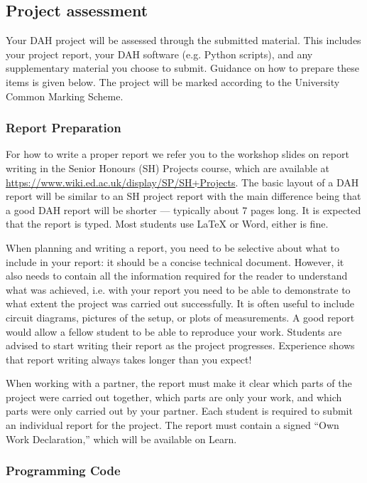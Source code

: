 \subsection{Project assessment}

Your DAH project will be assessed through the submitted material.
This includes your project report, your DAH software (e.g. Python scripts), and any supplementary material you choose to submit.
Guidance on how to prepare these items is given below.
The project will be marked according to the University Common Marking Scheme. 

\subsubsection{Report Preparation}

For how to write a proper report we refer you to the workshop slides on report writing in the Senior Honours (SH) Projects course, which are available at \url{https://www.wiki.ed.ac.uk/display/SP/SH+Projects}.
The basic layout of a DAH report will be similar to an SH project report with the main difference being that a good DAH report will be shorter --- typically about 7 pages long.
It is expected that the report is typed.
Most students use LaTeX or Word, either is fine.

When planning and writing a report, you need to be selective about what to include in your report: it should be a concise technical document.
However, it also needs to contain all the information required for the reader to understand what was achieved, i.e. with your report you need to be able to demonstrate to what extent the project was carried out successfully.
It is often useful to include circuit diagrams, pictures of the setup, or plots of measurements.
A good report would allow a fellow student to be able to reproduce your work.
Students are advised to start writing their report as the project progresses.
Experience shows that report writing always takes longer than you expect!

When working with a partner, the report must make it clear which parts of the project were carried out together, which parts are only your work, and which parts were only carried out by your partner.
Each student is required to submit an individual report for the project.
The report must contain a signed ``Own Work Declaration,'' which will be available on Learn.

\subsubsection{Programming Code}

